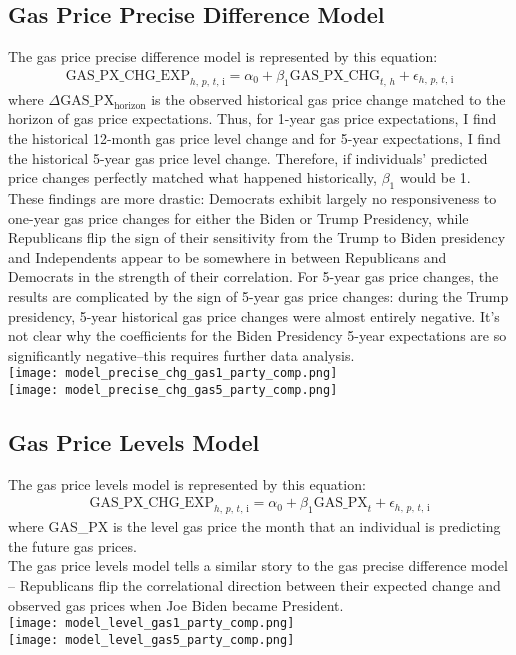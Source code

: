 \documentclass{article}
\begin{document}
\raggedright \subsection{Gas Price Precise Difference Model}
The gas price precise difference model is represented by this equation:
\begin{gather}
	 \text{GAS\_PX\_CHG\_EXP}_{h\text{, }p\text{, }t\text{, i}} = \alpha_0 + \beta_1 \text{GAS\_PX\_CHG}_{t\text{, }h} + \epsilon_{h\text{, }p\text{, }t\text{, i}}
\end{gather}
where $\Delta \text{GAS\_PX}_{\text{horizon}}$ is the observed historical gas price change matched to the horizon of gas price expectations. Thus, for 1-year gas price expectations, I find the historical 12-month gas price level change and for 5-year expectations, I find the historical 5-year gas price level change. Therefore, if individuals' predicted price changes perfectly matched what happened historically, $\beta_1$ would be 1. \\
\vspace{0.1in}
These findings are more drastic: Democrats exhibit largely no responsiveness to one-year gas price changes for either the Biden or Trump Presidency, while Republicans flip the sign of their sensitivity from the Trump to Biden presidency and Independents appear to be somewhere in between Republicans and Democrats in the strength of their correlation. For 5-year gas price changes, the results are complicated by the sign of 5-year gas price changes: during the Trump presidency, 5-year historical gas price changes were almost entirely negative. It's not clear why the coefficients for the Biden Presidency 5-year expectations are so significantly negative--this requires further data analysis. \\
\vspace{0.1in}
\centering \texttt{[image: model\_precise\_chg\_gas1\_party\_comp.png]} \\
\texttt{[image: model\_precise\_chg\_gas5\_party\_comp.png]} 

\raggedright \subsection{Gas Price Levels Model}
The gas price levels model is represented by this equation:
\begin{gather}
	 \text{GAS\_PX\_CHG\_EXP}_{h\text{, }p\text{, }t\text{, i}} = \alpha_0 + \beta_1 \text{GAS\_PX}_t + \epsilon_{h\text{, }p\text{, }t\text{, i}}
\end{gather}
where GAS\_PX is the level gas price the month that an individual is predicting the future gas prices.\\
\vspace{0.1in}
The gas price levels model tells a similar story to the gas precise difference model -- Republicans flip the correlational direction between their expected change and observed gas prices when Joe Biden became President. \\
\vspace{0.1in}
\centering \texttt{[image: model\_level\_gas1\_party\_comp.png]} \\
\texttt{[image: model\_level\_gas5\_party\_comp.png]} 
\end{document}
